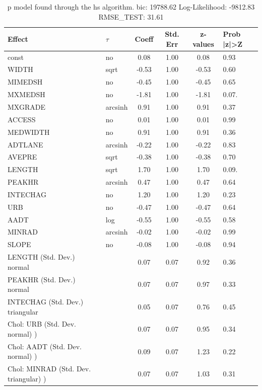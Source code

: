\begin{table}
	\caption{p model found through the hs algorithm. bic: 19788.62 Log-Likelihood: -9812.83 RMSE_TEST: 31.61}
	\begin{center}
		\begin{tabular}{|l|l|c|c|c|l|}
			\hline
			Effect & $\tau$ & Coeff & Std. Err & z-values & Prob |z|>Z \\
			\hline
			const & no & 0.08 & 1.00 & 0.08 & 0.93 \\
			\hline
			WIDTH & sqrt & -0.53 & 1.00 & -0.53 & 0.60 \\
			\hline
			MIMEDSH & no & -0.45 & 1.00 & -0.45 & 0.65 \\
			\hline
			MXMEDSH & no & -1.81 & 1.00 & -1.81 & 0.07. \\
			\hline
			MXGRADE & arcsinh & 0.91 & 1.00 & 0.91 & 0.37 \\
			\hline
			ACCESS & no & 0.01 & 1.00 & 0.01 & 0.99 \\
			\hline
			MEDWIDTH & no & 0.91 & 1.00 & 0.91 & 0.36 \\
			\hline
			ADTLANE & arcsinh & -0.22 & 1.00 & -0.22 & 0.83 \\
			\hline
			AVEPRE & sqrt & -0.38 & 1.00 & -0.38 & 0.70 \\
			\hline
			LENGTH & sqrt & 1.70 & 1.00 & 1.70 & 0.09. \\
			\hline
			PEAKHR & arcsinh & 0.47 & 1.00 & 0.47 & 0.64 \\
			\hline
			INTECHAG & no & 1.20 & 1.00 & 1.20 & 0.23 \\
			\hline
			URB & no & -0.47 & 1.00 & -0.47 & 0.64 \\
			\hline
			AADT & log & -0.55 & 1.00 & -0.55 & 0.58 \\
			\hline
			MINRAD & arcsinh & -0.02 & 1.00 & -0.02 & 0.99 \\
			\hline
			SLOPE & no & -0.08 & 1.00 & -0.08 & 0.94 \\
			\hline
			LENGTH (Std. Dev.) normal &  & 0.07 & 0.07 & 0.92 & 0.36 \\
			\hline
			PEAKHR (Std. Dev.) normal &  & 0.07 & 0.07 & 0.97 & 0.33 \\
			\hline
			INTECHAG (Std. Dev.) triangular &  & 0.05 & 0.07 & 0.76 & 0.45 \\
			\hline
			 Chol: URB (Std. Dev. normal) ) &  & 0.07 & 0.07 & 0.95 & 0.34 \\
			\hline
			 Chol: AADT (Std. Dev. normal) ) &  & 0.09 & 0.07 & 1.23 & 0.22 \\
			\hline
			 Chol: MINRAD (Std. Dev. triangular) ) &  & 0.07 & 0.07 & 1.03 & 0.31 \\

\end{tabular}
\end{center}
\end{table}
